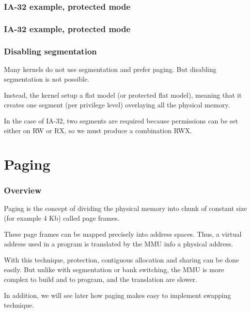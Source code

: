 
\begin{frame}
  \frametitle{IA-32 example, protected mode}

  \begin{center}
  \end{center}

\end{frame}


\begin{frame}
  \frametitle{IA-32 example, protected mode}

  \begin{center}
  \end{center}

\end{frame}


\begin{frame}
  \frametitle{Disabling segmentation}

  Many kernels do not use segmentation and prefer paging. But
  disabling segmentation is not possible.

  \-

  Instead, the kernel setup a flat model (or protected flat model),
  meaning that it creates one segment (per privilege level) overlaying
  all the physical memory.

  \-

  In the case of IA-32, two segments are required because permissions
  can be set either on RW or RX, so we must produce a combination RWX.

\end{frame}

%
%

\section{Paging}


\begin{frame}
  \frametitle{Overview}

  Paging is the concept of dividing the physical memory into chunk of
  constant size (for example 4 Kb) called page frames.

  \-

  These page frames can be mapped precisely into address spaces. Thus,
  a virtual address used in a program is translated by the MMU info a
  physical address.

  \-

  With this technique, protection, contiguous allocation and sharing
  can be done easily. But unlike with segmentation or bank switching,
  the MMU is more complex to build and to program, and the translation
  are slower.

  \-

  In addition, we will see later how paging makes easy to implement
  swapping technique.

\end{frame}

